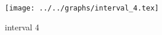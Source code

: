 \begin{figure}[h] \centering\texttt{[image: ../../graphs/interval\_4.tex]}\caption{interval 4}\label{gr:interval_4} \end{figure}
